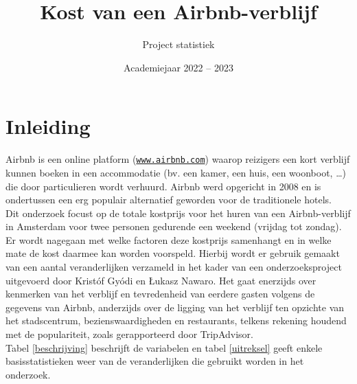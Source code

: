 \documentclass[a4paper]{kulakarticle}
\title{Kost van een Airbnb-verblijf}
\author{Project statistiek}
\date{Academiejaar 2022 -- 2023}
\begin{document}
	\maketitle
	\section*{Inleiding}
	Airbnb is een online platform (\href{https://www.airbnb.com}{\texttt{www.airbnb.com}}) waarop reizigers een kort verblijf kunnen boeken in een accommodatie (bv. een kamer, een huis, een woonboot, …) die door particulieren wordt verhuurd. Airbnb werd opgericht in 2008 en is ondertussen een erg populair alternatief geworden voor de traditionele hotels. \\
	
	Dit onderzoek focust op de totale kostprijs voor het huren van een Airbnb-verblijf in Amsterdam voor twee personen gedurende een weekend (vrijdag tot zondag). Er wordt nagegaan met welke factoren deze kostprijs samenhangt en in welke mate de kost daarmee kan worden voorspeld. Hierbij wordt er gebruik gemaakt van een aantal veranderlijken verzameld in het kader van een onderzoeksproject uitgevoerd door Kristóf Gyódi en Łukasz Nawaro. Het gaat enerzijds over kenmerken van het verblijf en tevredenheid van eerdere gasten volgens de gegevens van Airbnb, anderzijds over de ligging van het verblijf ten opzichte van het stadscentrum, bezienswaardigheden en restaurants, telkens rekening houdend met de populariteit, zoals gerapporteerd door TripAdvisor.\\
	
	Tabel \ref{beschrijving} beschrijft de variabelen en tabel \ref{uitreksel} geeft enkele basisstatistieken weer van de veranderlijken die gebruikt worden in het onderzoek. \\\\
\end{document}
